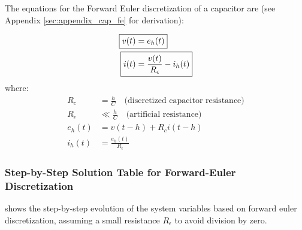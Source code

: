 The equations for the Forward Euler discretization of a capacitor are (see Appendix \ref{sec:appendix_cap_fe} for derivation):

\begin{tcolorbox}[colback=hotPink!5, colframe=hotPink!80!black, title={\color{white}\textbf{Forward Euler: Capacitor Companion Model}}]
\begin{align}
    \Aboxed{v(t) &= e_h(t)} \label{eq:vt_cap_fe} \\
    \Aboxed{i(t) &= \frac{v(t)}{R_\epsilon} - i_h(t)} \label{eq:it_cap_fe}
\end{align}
where:
\begin{align}
    R_c &= \frac{h}{C} \quad \text{(discretized capacitor resistance)} \\
    R_\epsilon &\ll \frac{h}{C} \quad \text{(artificial resistance)} \\
    e_h(t) &= v(t-h) + R_c i(t-h) \\
    i_h(t) &= \frac{e_h(t)}{R_\epsilon}
\end{align}
\end{tcolorbox}

\vspace{1em}
\subsubsection*{Step-by-Step Solution Table for Forward-Euler Discretization}
 shows the step-by-step evolution of the system variables based on forward euler discretization, assuming a small resistance \( R_\epsilon \) to avoid division by zero.

